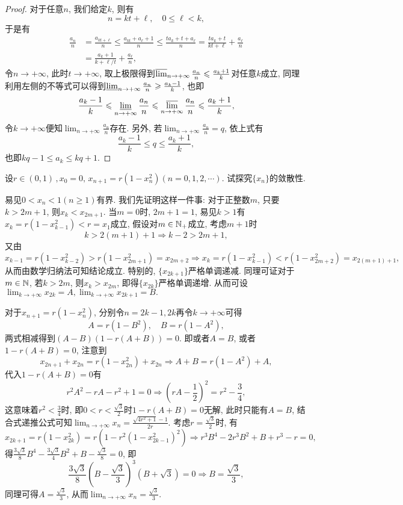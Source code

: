 \begin{quiza}
\begin{proof}
对于任意\(n\), 我们给定\(k\), 则有\[n=kt+\ell,\quad0\leqslant \ell<k,\]于是有\[\begin{split}
\frac{a_n}{n}&=\frac{a_{kt+\ell}}{n}\leqslant\frac{a_{kt}+a_{\ell}+1}{n}\leqslant\frac{ta_k+t+a_{\ell}}{n}=\frac{ta_k+t}{kt+\ell}+\frac{a_{\ell}}{n}\\&=\frac{a_k+1}{k+\ell/t}+\frac{a_{\ell}}{n},
\end{split}\]
令\(n\rightarrow+\infty\), 此时\(t\rightarrow+\infty\), 取上极限得到\(\varlimsup_{n\to+\infty}\frac{a_n}{n}\leqslant\frac{a_k+1}{k}\)对任意\(k\)成立, 同理利用左侧的不等式可以得到\(\varliminf_{n\rightarrow+\infty}\frac{a_n}{n}\geqslant\frac{a_k-1}{k}\), 也即\[\frac{a_k-1}{k}\leqslant\varliminf_{n\rightarrow+\infty}\frac{a_n}{n}\leqslant\varlimsup_{n\rightarrow+\infty}\frac{a_n}{n}\leqslant\frac{a_k+1}{k},\]令\(k\rightarrow+\infty\)便知\(\lim_{n\to+\infty}\frac{a_n}{n}\)存在. 另外, 若\(\lim_{n\to+\infty}\frac{a_n}{n}=q\), 依上式有\[\frac{a_k-1}{k}\leqslant q\leqslant\frac{a_k+1}{k},\]也即\(kq-1\leqslant a_k\leqslant kq+1\).
\end{proof}
\woe 设\(r\in (0,1)\,,x_0=0,\,x_{n+1}=r(1-x_n^2)(n=0,1,2,\cdots)\). 试探究\(\{x_n\}\)的敛散性.
\begin{solution}
易见\(0<x_n<1(n\geqslant 1)\)有界. 我们先证明这样一件事: 对于正整数\(m\), 只要\(k>2m+1\), 则\(x_k<x_{2m+1}\). 当\(m=0\)时, \(2m+1=1\), 易见\(k>1\)有\(x_k=r(1-x_{k-1}^2)<r=x_1\)成立, 假设对\(m\in\mathbb{N}_+\)成立, 考虑\(m+1\)时\[k>2(m+1)+1\Rightarrow k-2>2m+1,\]又由\[x_{k-1}=r(1-x_{k-2}^2)>r(1-x_{2m+1}^2)=x_{2m+2}\Rightarrow x_k=r(1-x_{k-1}^2)<r(1-x_{2m+2}^2)=x_{2(m+1)+1},\]从而由数学归纳法可知结论成立. 特别的, \(\{x_{2k+1}\}\)严格单调递减. 同理可证对于\(m\in\mathbb{N}\), 若\(k>2m\), 则\(x_k>x_{2m}\), 即得\(\{x_{2k}\}\)严格单调递增. 从而可设\(\lim_{k\rightarrow+\infty}x_{2k}=A,\lim_{k\rightarrow+\infty}x_{2k+1}=B.\)

对于\(x_{n+1}=r(1-x_n^2)\), 分别令\(n=2k-1,2k\)再令\(k\rightarrow+\infty\)可得\[A=r(1-B^2),\quad B=r(1-A^2),\]两式相减得到\(\left(A-B\right)\left(1-r(A+B)\right)=0\). 即或者\(A=B\), 或者\(1-r(A+B)=0\), 注意到
\[x_{2n+1}+x_{2n}=r(1-x_{2n}^2)+x_{2n}\Rightarrow A+B=r(1-A^2)+A,\]
代入\(1-r(A+B)=0\)有\[r^2A^2-rA-r^2+1=0\Rightarrow\left(rA-\frac{1}{2}\right)^2=r^2-\frac{3}{4},\]这意味着\(r^2<\frac{3}{4}\)时, 即\(0<r<\frac{\sqrt{3}}{2}\)时\(1-r(A+B)=0\)无解, 此时只能有\(A=B\), 结合式递推公式可知\(\lim_{n\rightarrow+\infty}x_n=\frac{\sqrt{4r^2+1}-1}{2r}.\)
考虑\(r=\frac{\sqrt{3}}{2}\)时, 有\[x_{2k+1}=r(1-x_{2k}^2)=r\left(1-r^2(1-x_{2k-1}^2)^2\right)\Rightarrow r^3B^4-2r^3B^2+B+r^3-r=0,\]得\(\frac{3\sqrt{3}}{8}B^4-\frac{3\sqrt{3}}{4}B^2+B-\frac{\sqrt{3}}{8}=0\), 即\[\frac{3\sqrt{3}}{8}\left(B-\frac{\sqrt{3}}{3}\right)^3(B+\sqrt{3})=0\Rightarrow B=\frac{\sqrt{3}}{3},\]同理可得\(A=\frac{\sqrt{3}}{3}\), 从而\(\lim_{n\rightarrow+\infty}x_n=\frac{\sqrt{3}}{3}\).


\end{solution}
\end{quiza}
